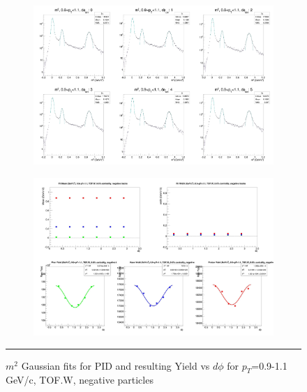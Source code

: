 \begin{figure}[H]
  \centering
    \begin{subfigure}[p]{1\textwidth}
    \includegraphics[width=1\textwidth]{lowptfits/yieldvsdphi_tof1_cent0_ch0_pT-9-11.jpg}
    \end{subfigure}
    \begin{subfigure}[p]{1\textwidth}
    \includegraphics[width=1\textwidth]{lowptfits/fitParams_tof1_cent0_ch0_pT-9-11.jpg}
    \end{subfigure}
    \rule{35em}{0.5pt}
  \caption[PID fits and Yield vs $d\phi$ for $p_T$=0.9-1.1 GeV/c, TOF.W, negative particles ]{$m^2$ Gaussian fits for PID and resulting Yield vs $d\phi$ for $p_T$=0.9-1.1 GeV/c, TOF.W, negative particles}
  \label{fig:fits9-11neg}
\end{figure}

